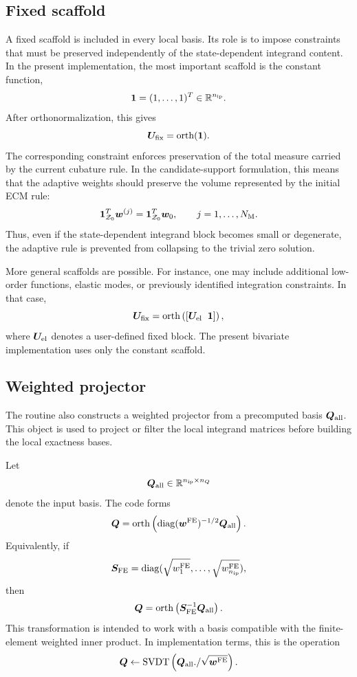 \documentclass[11pt,a4paper]{article}
\begin{document}
\subsection{Fixed scaffold}

A fixed scaffold is included in every local basis. Its role is to impose
constraints that must be preserved independently of the state-dependent
integrand content. In the present implementation, the most important scaffold
is the constant function,
\[
        \bm 1 =
        (1,\ldots,1)^T\in\mathbb{R}^{n_{\mathrm{ip}}}.
\]
After orthonormalization, this gives
\[
        \bm U_{\mathrm{fix}} = \operatorname{orth}(\bm 1).
\]
The corresponding constraint enforces preservation of the total measure carried
by the current cubature rule. In the candidate-support formulation, this means
that the adaptive weights should preserve the volume represented by the initial
ECM rule:
\[
        \bm 1_{\mathcal{Z}_{0}}^T \bm w^{(j)}
        =
        \bm 1_{\mathcal{Z}_{0}}^T \bm w_{0},
        \qquad
        j=1,\ldots,N_{\mathrm{M}}.
\]
Thus, even if the state-dependent integrand block becomes small or degenerate,
the adaptive rule is prevented from collapsing to the trivial zero solution.

More general scaffolds are possible. For instance, one may include additional
low-order functions, elastic modes, or previously identified integration
constraints. In that case,
\[
        \bm U_{\mathrm{fix}}
        =
        \operatorname{orth}
        \left(
        [\bm U_{\mathrm{el}}\;\;\bm 1]
        \right),
\]
where $\bm U_{\mathrm{el}}$ denotes a user-defined fixed block. The present bivariate
implementation uses only the constant scaffold.

\subsection{Weighted projector}

The routine also constructs a weighted projector from a precomputed basis
$\bm Q_{\mathrm{all}}$. This object is used to project or filter the local integrand matrices
before building the local exactness bases.

Let
\[
        \bm Q_{\mathrm{all}} \in \mathbb{R}^{n_{\mathrm{ip}}\times n_Q}
\]
denote the input basis. The code forms
\[
        \bm Q
        =
        \operatorname{orth}
        \left(
        \operatorname{diag}(\bm w^{\mathrm{FE}})^{-1/2}\bm Q_{\mathrm{all}}
        \right).
\]
Equivalently, if
\[
        \bm S_{\mathrm{FE}}
        =
        \operatorname{diag}(\sqrt{w^{\mathrm{FE}}_1},\ldots,\sqrt{w^{\mathrm{FE}}_{n_{\mathrm{ip}}}}),
\]
then
\[
        \bm Q
        =
        \operatorname{orth}
        \left(
        \bm S_{\mathrm{FE}}^{-1}\bm Q_{\mathrm{all}}
        \right).
\]
This transformation is intended to work with a basis compatible with the
finite-element weighted inner product. In implementation terms, this is the
operation
\[
        \bm Q
        \leftarrow
        \operatorname{SVDT}
        \left(
        \bm Q_{\mathrm{all}} ./ \sqrt{\bm w^{\mathrm{FE}}}
        \right).
\]
\end{document}
